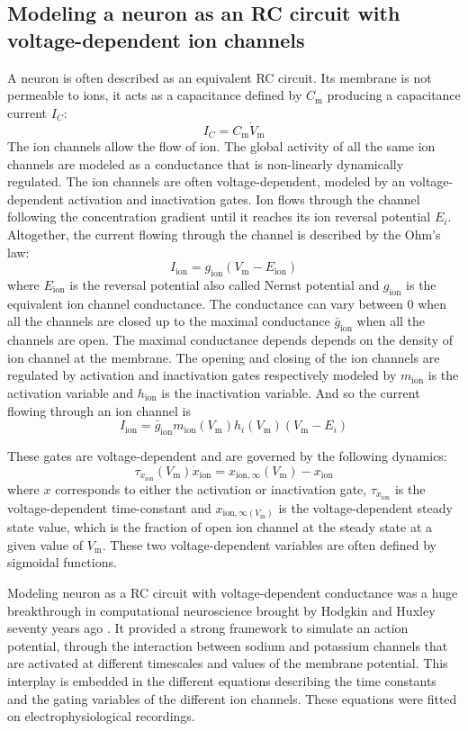 \subsection{Modeling a neuron as an RC circuit with voltage-dependent ion channels}
A neuron is often described as an equivalent RC circuit. Its membrane is not permeable to ions, it acts as a capacitance defined by $C_\mathrm{m}$ producing a capacitance current $I_C$: 
$$I_C = C_\mathrm{m} \dot{V}_\mathrm{m}$$ 
The ion channels allow the flow of ion. The global activity of all the same ion channels are modeled as a conductance that is non-linearly dynamically regulated. The ion channels are often voltage-dependent, modeled by an voltage-dependent activation and inactivation gates. Ion flows through the channel following the concentration gradient until it reaches its ion reversal potential $E_i$. Altogether, the current flowing through the channel is described by the Ohm's law: $$I_{\mathrm{ion}} =  g_{\mathrm{ion}} (V_\mathrm{m} - E_{\mathrm{ion}})$$
where $E_{\mathrm{ion}}$ is the reversal potential also called Nernst potential and $g_\mathrm{ion}$ is the equivalent ion channel conductance. The conductance can vary between 0 when all the channels are closed up to the maximal conductance $\bar{g}_{\mathrm{ion}}$ when all the channels are open. The maximal conductance depends depends on the density of ion channel at the membrane. The opening and closing of the ion channels are regulated by activation and inactivation gates respectively modeled by $m_{\mathrm{ion}}$ is the activation variable and $h_{\mathrm{ion}}$ is the inactivation variable. And so the current flowing through an ion channel is 
$$I_{\mathrm{ion}} = \bar{g}_{\mathrm{ion}} m_{\mathrm{ion}}(V_\mathrm{m}) h_i(V_\mathrm{m}) (V_\mathrm{m} - E_i)$$

These gates are voltage-dependent and are governed by the following dynamics: 
$$ \tau_{x_{\mathrm{ion}}} (V_\mathrm{m}) \dot{x}_{\mathrm{ion}} = x_{{\mathrm{ion}},\infty}(V_\mathrm{m}) - x_{\mathrm{ion}}$$
where $x$ corresponds to either the activation or inactivation gate, $\tau_{x_{\mathrm{ion}}}$ is the voltage-dependent time-constant and $x_{{\mathrm{ion}},\infty(V_\mathrm{m})}$ is the voltage-dependent steady state value, which is the fraction of open ion channel at the steady state at a given value of $V_\mathrm{m}$. These two voltage-dependent variables are often defined by sigmoidal functions.  

Modeling neuron as a RC circuit with voltage-dependent conductance was a huge breakthrough in computational neuroscience brought by Hodgkin and Huxley seventy years ago \citep{hodgkin_quantitative_1952}. It provided a strong framework to simulate an action potential, through the interaction between sodium and potassium channels that are activated at different timescales and values of the membrane potential. This interplay is embedded in the different equations describing the time constants and the gating variables of the different ion channels. These equations were fitted on electrophysiological recordings. 

